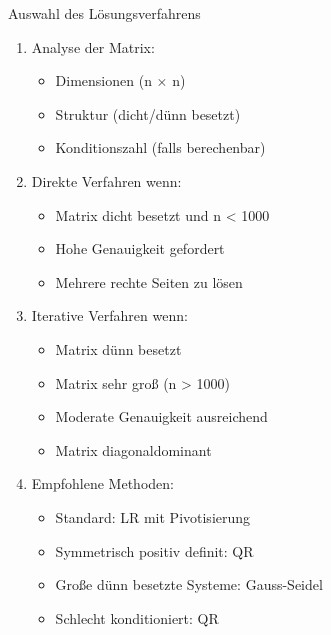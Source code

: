 \begin{KR}{Auswahl des Lösungsverfahrens}
\begin{enumerate}
    \item Analyse der Matrix:
    \begin{itemize}
        \item Dimensionen (n × n)
        \item Struktur (dicht/dünn besetzt)
        \item Konditionszahl (falls berechenbar)
    \end{itemize}
    
    \item Direkte Verfahren wenn:
    \begin{itemize}
        \item Matrix dicht besetzt und n < 1000
        \item Hohe Genauigkeit gefordert
        \item Mehrere rechte Seiten zu lösen
    \end{itemize}
    
    \item Iterative Verfahren wenn:
    \begin{itemize}
        \item Matrix dünn besetzt
        \item Matrix sehr groß (n > 1000)
        \item Moderate Genauigkeit ausreichend
        \item Matrix diagonaldominant
    \end{itemize}
    
    \item Empfohlene Methoden:
    \begin{itemize}
        \item Standard: LR mit Pivotisierung
        \item Symmetrisch positiv definit: QR
        \item Große dünn besetzte Systeme: Gauss-Seidel
        \item Schlecht konditioniert: QR
    \end{itemize}
\end{enumerate}
\end{KR}

